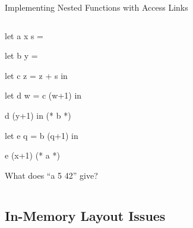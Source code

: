 \documentclass{plt}
\begin{document}
\begin{frame}[fragile]{Implementing Nested Functions with Access Links}

\begin{columns}
  \begin{column}{0.5\textwidth}
\begin{ocaml}
let a x s =

  let b y =

    let c z = z + s in

    let d w = c (w+1) in

    d (y+1) in (* b *)

  let e q = b (q+1) in

e (x+1) (* a *)
\end{ocaml}

What does ``a 5 42'' give?


  \end{column}
  \begin{column}{0.5\textwidth}
      \begin{overlayarea}{\textwidth}{0.8\textheight}
      \end{overlayarea}
  \end{column}
\end{columns}
\end{frame}

\subsection{In-Memory Layout Issues}
\end{document}
